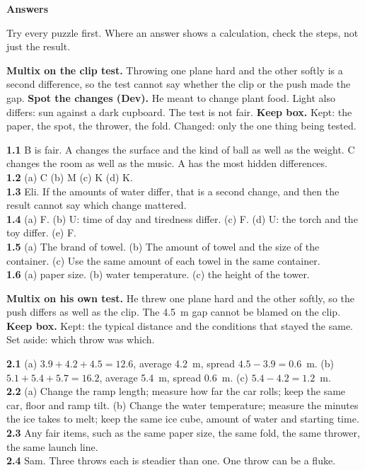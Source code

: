 \clearpage\label{answers}
{\sans\bfseries\LARGE\color{ink} Answers}\par
\small
Try every puzzle first. Where an answer shows a calculation, check the steps, not just the result.

\textbf{Multix on the clip test.} Throwing one plane hard and the other softly is a second difference, so the test cannot say whether the clip or the push made the gap. \textbf{Spot the changes (Dev).} He meant to change plant food. Light also differs: sun against a dark cupboard. The test is not fair. \textbf{Keep box.} Kept: the paper, the spot, the thrower, the fold. Changed: only the one thing being tested.

\textbf{1.1} B is fair. A changes the surface and the kind of ball as well as the weight. C changes the room as well as the music. A has the most hidden differences.\\
\textbf{1.2} (a) C (b) M (c) K (d) K.\\
\textbf{1.3} Eli. If the amounts of water differ, that is a second change, and then the result cannot say which change mattered.\\
\textbf{1.4} (a) F. (b) U: time of day and tiredness differ. (c) F. (d) U: the torch and the toy differ. (e) F.\\
\textbf{1.5} (a) The brand of towel. (b) The amount of towel and the size of the container. (c) Use the same amount of each towel in the same container.\\
\textbf{1.6} (a) paper size. (b) water temperature. (c) the height of the tower.

\textbf{Multix on his own test.} He threw one plane hard and the other softly, so the push differs as well as the clip. The 4.5~m gap cannot be blamed on the clip. \textbf{Keep box.} Kept: the typical distance and the conditions that stayed the same. Set aside: which throw was which.

\textbf{2.1} (a) $3.9+4.2+4.5=12.6$, average 4.2~m, spread $4.5-3.9=0.6$~m. (b) $5.1+5.4+5.7=16.2$, average 5.4~m, spread 0.6~m. (c) $5.4-4.2=1.2$~m.\\
\textbf{2.2} (a) Change the ramp length; measure how far the car rolls; keep the same car, floor and ramp tilt. (b) Change the water temperature; measure the minutes the ice takes to melt; keep the same ice cube, amount of water and starting time.\\
\textbf{2.3} Any fair items, such as the same paper size, the same fold, the same thrower, the same launch line.\\
\textbf{2.4} Sam. Three throws each is steadier than one. One throw can be a fluke.


